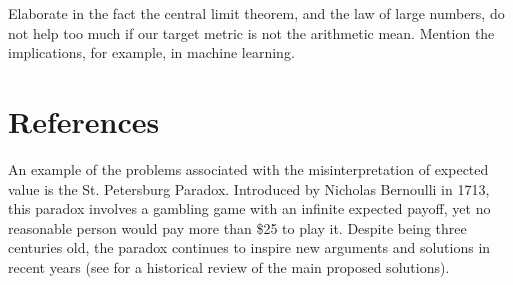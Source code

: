 {\color{red} Elaborate in the fact the central limit theorem, and the law of large numbers, do not help too much if our target metric is not the arithmetic mean. Mention the implications, for example, in machine learning.}

%
%
\section*{References}

An example of the problems associated with the misinterpretation of expected value is the St. Petersburg Paradox. Introduced by Nicholas Bernoulli in 1713, this paradox involves a gambling game with an infinite expected payoff, yet no reasonable person would pay more than \$25 to play it. Despite being three centuries old, the paradox continues to inspire new arguments and solutions in recent years (see \cite{huang2013three} for a historical review of the main proposed solutions).






